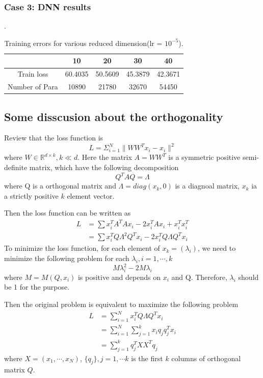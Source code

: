 \subsubsection{Case 3: DNN results}
.\begin{table}[H]
	\begin{center}
		\begin{tabular}{|c|c|c|c|c|}
			\hline
			& 10 & 20 & 30& 40 \\
			\hline
			Train loss & 60.4035  & 50.5609 & 45.3879 & 42.3671 \\
			\hline
			Number of Para & 10890& 21780& 32670 & 54450\\
			\hline
		\end{tabular}\caption{Training errors for various reduced dimension(lr = $10^{-5}$).}
	\end{center}
\end{table}
\subsection{Some disscusion about the orthogonality}
Review that the loss function is 
$$
L = \Sigma_{i=1}^N \| WW^Tx_i  -x_i \| ^2
$$
where $W\in \mathbb{R}^{d\times k}, k \ll d$. Here the matrix $A=WW^T$ is a symmetric positive semi-definite matrix, which have the following decomposition
$$
Q^TAQ  = \Lambda
$$
where Q is a orthogonal matrix and $\Lambda = diag(x_k, 0)$ is a diagnoal matrix, $x_k$ ia a strictly positive  $k$ element vector.

Then the loss function can be written as
$$
\begin{aligned}
L&= \sum x_i^TA^TAx_i - 2x_i^TAx_i +x_i^Tx_i^T\\
&= \sum x_i^TQ \Lambda^2 Q^Tx_i - 2x_i^TQ\Lambda Q^Tx_i
\end{aligned}
$$
To minimize the loss function, for each element of $x_k=(\lambda_i)$, we need to minimize the following problem for each $\lambda_i, i = 1,\cdots, k$
$$
M \lambda_i^2 - 2M \lambda_i
$$
where $M=M(Q,x_i)$ is  positive and depends on $x_i$ and Q. Therefore, $\lambda_i$ should be 1 for the purpose.

Then the original problem is equivalent to maximize the following problem
$$
\begin{aligned}
L & = \sum_{i=1}^{N}x_i^TQ \Lambda Q^T x_i\\
& = \sum_{i=1}^N \sum_{j=1}^k x_i q_j q_j^T x_i\\
& = \sum_{j=1}^k q_j^TXX^T q_j
\end{aligned}
$$
where $X = (x_1,\cdots,x_N)$, $\{q_j\}, j=1,\cdots k$ is the first $k$ columns of orthogonal matrix $Q$.

